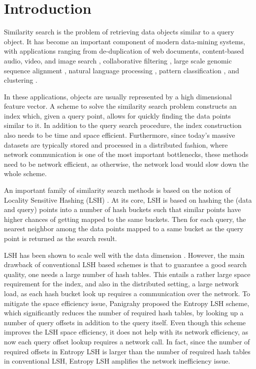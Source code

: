 \documentclass{acm_proc_article-sp}
\numberwithin{equation}{section}
\numberwithin{figure}{section}
\begin{document}
\section{Introduction}
\label{sec:intro}

Similarity search is the problem of retrieving data objects similar to a query object. It has become an important component of modern data-mining systems, with applications ranging from de-duplication of web documents, content-based audio, video, and image search \cite{Brian:Kulis, Charikar:multiprobe, google:video:lsh}, collaborative filtering \cite{google-news}, large scale genomic sequence alignment \cite{Buhler}, natural language processing \cite{ravi:NLP:clustering}, pattern classification \cite{cover67}, and clustering \cite{berkhin}.  


In these applications, objects are usually represented by a high dimensional feature vector. A scheme to solve the similarity search problem constructs an index which, given a query point, allows for quickly finding the data points similar to it. In addition to the query search procedure, the index construction also needs to be time and space efficient. Furthermore, since today's massive datasets are typically stored and processed in a distributed fashion, where network communication is one of the most important bottlenecks, these methods need to be network efficient, as otherwise, the network load would slow down the whole scheme.

An important family of similarity search methods is based on the notion of Locality Sensitive Hashing (LSH) \cite{im98}. At its core, LSH is based on hashing the (data and query) points into a number of hash buckets such that similar points have higher chances of getting mapped to the same buckets. Then for each query, the nearest neighbor among the data points mapped to a same bucket as the query point is returned as the search result.

LSH has been shown to scale well with the data dimension \cite{im98,KOR98}. However, the main drawback of conventional LSH based schemes is that to guarantee a good search quality, one needs a large number of hash tables. This entails a rather large space requirement for the index, and also in the distributed setting, a large network load, as each hash bucket look up requires a communication over the network. To mitigate the space efficiency issue, Panigrahy \cite{P06} proposed the Entropy LSH scheme, which significantly reduces the number of required hash tables, by looking up a number of query offsets in addition to the query itself. Even though this scheme improves the LSH space efficiency, it does not help with its network efficiency, as now each query offset lookup requires a network call. In fact, since the number of required offsets in Entropy LSH is larger than the number of required hash tables in conventional LSH, Entropy LSH amplifies the network inefficiency issue.
\end{document}
